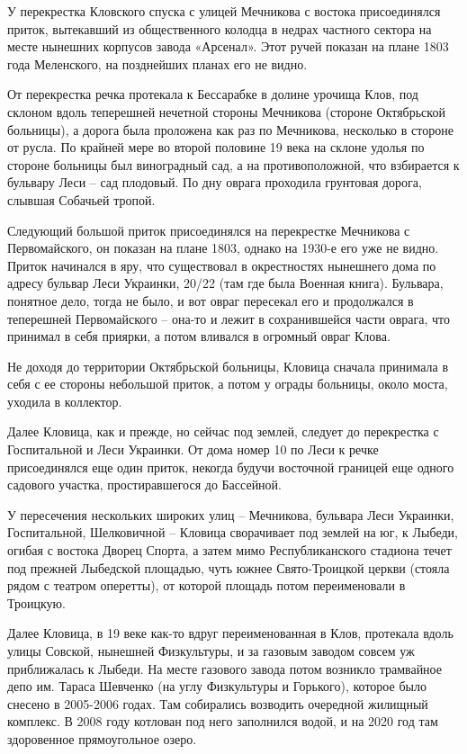 У перекрестка Кловского спуска с улицей Мечникова с востока присоединялся приток, вытекавший из общественного колодца в недрах частного сектора на месте нынешних корпусов завода «Арсенал». Этот ручей показан на плане 1803 года Меленского, на позднейших планах его не видно.

От перекрестка речка протекала к Бессарабке в долине урочища Клов, под склоном вдоль теперешней нечетной стороны Мечникова (стороне Октябрьской больницы), а дорога была проложена как раз по Мечникова, несколько в стороне от русла. По крайней мере во второй половине 19 века на склоне удолья по стороне больницы был виноградный сад, а на противоположной, что взбирается к бульвару Леси – сад плодовый. По дну оврага проходила грунтовая дорога, слывшая Собачьей тропой.

Следующий большой приток присоединялся на перекрестке Мечникова с Первомайского, он показан на плане 1803, однако на 1930-е его уже не видно. Приток начинался в яру, что существовал в окрестностях нынешнего дома по адресу бульвар Леси Украинки, 20/22 (там где была Военная книга). Бульвара, понятное дело, тогда не было, и вот овраг пересекал его и продолжался в теперешней Первомайского – она-то и лежит в сохранившейся части оврага, что принимал в себя приярки, а потом вливался в огромный овраг Клова.

Не доходя до территории Октябрьской больницы, Кловица сначала принимала в себя с ее стороны небольшой приток, а потом у ограды больницы, около моста, уходила в коллектор.

Далее Кловица, как и прежде, но сейчас под землей, следует до перекрестка с Госпитальной и Леси Украинки. От дома номер 10 по Леси к речке присоединялся еще один приток, некогда будучи восточной границей еще одного садового участка, простиравшегося до Бассейной.

У пересечения нескольких широких улиц – Мечникова, бульвара Леси Украинки, Госпитальной, Шелковичной – Кловица сворачивает под землей на юг, к Лыбеди, огибая с востока Дворец Спорта, а затем мимо Республиканского стадиона течет под прежней Лыбедской площадью, чуть южнее Свято-Троицкой церкви (стояла рядом с театром оперетты), от которой площадь потом переименовали в Троицкую.

Далее Кловица, в 19 веке как-то вдруг переименованная в Клов, протекала вдоль улицы Совской, нынешней Физкультуры, и за газовым заводом совсем уж приближалась к Лыбеди. На месте газового завода потом возникло трамвайное депо им. Тараса Шевченко (на углу Физкультуры и Горького), которое было снесено в 2005-2006 годах. Там собирались возводить очередной жилищный комплекс. В 2008 году котлован под него заполнился водой, и на 2020 год там здоровенное прямоугольное озеро.

